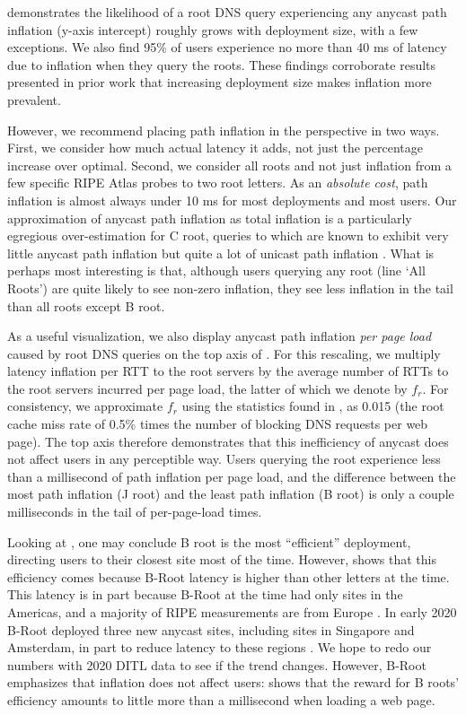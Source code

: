 \documentclass[sigconf,letterpaper,nonacm,10pt,anonymous]{acmart}
\begin{document}
 demonstrates the likelihood of a root DNS
query experiencing any anycast path inflation (y-axis intercept) roughly
grows with deployment size, with a few exceptions. We also find 95\% of
users experience no more than 40 ms of latency due to inflation when
they query the roots. These findings corroborate results presented in
prior work \cite{li_levin_spring_bhattacharjee_2018} that increasing
deployment size makes inflation more prevalent.

However, we recommend placing path inflation in the perspective in two
ways. First, we consider how much actual latency it adds, not just the
percentage increase over optimal. Second, we consider all roots and not
just inflation from a few specific RIPE Atlas probes to two root
letters. As an \emph{absolute cost}, path inflation is almost always
under 10 ms for most deployments and most users. Our approximation of
anycast path inflation as total inflation is a particularly egregious
over-estimation for C root, queries to which are known to exhibit very
little anycast path inflation but quite a lot of unicast path inflation
\cite{li_levin_spring_bhattacharjee_2018}. What is perhaps most
interesting is that, although users querying any root (line `All Roots')
are quite likely to see non-zero inflation, they see less inflation in
the tail than all roots except B root.

As a useful visualization, we also display anycast path inflation
\emph{per page load} caused by root DNS queries on the top axis of
. For this rescaling, we multiply latency
inflation per RTT to the root servers by the average number of RTTs to
the root servers incurred per page load, the latter of which we denote
by \(f_r\). For consistency, we approximate \(f_r\) using the statistics
found in , as 0.015 (the root cache miss rate
of 0.5\% times the number of blocking DNS requests per web page). The
top axis therefore demonstrates that this inefficiency of anycast does
not affect users in any perceptible way. Users querying the root
experience less than a millisecond of path inflation per page load, and
the difference between the most path inflation (J root) and the least
path inflation (B root) is only a couple milliseconds in the tail of
per-page-load times.

Looking at , one may conclude B root is the
most ``efficient'' deployment, directing users to their closest site
most of the time. However,  shows that
this efficiency comes because B-Root latency is higher than other
letters at the time. This latency is in part because B-Root at the time
had only sites in the Americas, and a majority of RIPE measurements are
from Europe \cite{staff2015ripe}. In early 2020 B-Root deployed three
new anycast sites, including sites in Singapore and Amsterdam, in part
to reduce latency to these regions \cite{BRoot20a}. We hope to redo our
numbers with 2020 DITL data to see if the trend changes. However, B-Root
emphasizes that inflation does not affect users:
 shows that the reward for B roots'
efficiency amounts to little more than a millisecond when loading a web
page.
\end{document}
